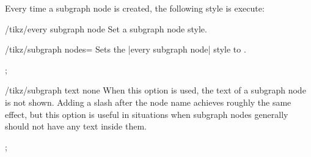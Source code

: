 Every time a subgraph node is created, the following style is execute:

\begin{key}{/tikz/every subgraph node}
    Set a subgraph node style.
\end{key}

\begin{key}{/tikz/subgraph nodes=}
    Sets the |every subgraph node| style to .
\begin{codeexample}[]
\tikz [subgraph text bottom=text centered,
       subgraph nodes=red]
  ;
\end{codeexample}
\end{key}

\begin{key}{/tikz/subgraph text none}
    When this option is used, the text of a subgraph node is not shown. Adding
    a slash after the node name achieves roughly the same effect, but this
    option is useful in situations when subgraph nodes generally should not
    have any text inside them.
\begin{codeexample}[]
  ;
\end{codeexample}
\end{key}

